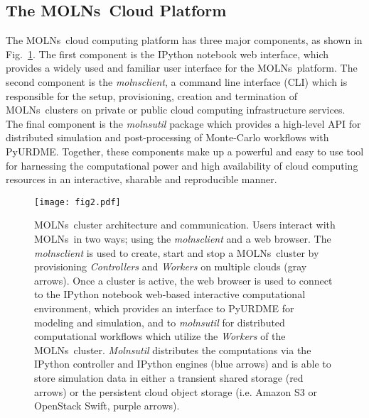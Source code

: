 \documentclass[final,leqno,onefignum,onetabnum]{siamltex1213}
\def\packagename {MOLNs}
\begin{document}
\subsection{The \packagename~Cloud Platform}

The  \packagename~cloud computing platform has three major components, as shown in Fig.~\ref{fig:fig2}. The first component is the IPython notebook web interface, which provides a widely used and familiar user interface for the \packagename~platform. The second component is the \emph{molnsclient}, a command line interface (CLI) which is responsible for the setup, provisioning, creation and termination of \packagename~clusters on private or public cloud computing infrastructure services.  The final component is the \emph{molnsutil} package which provides a high-level API for distributed simulation and post-processing of Monte-Carlo workflows with PyURDME.  Together, these components make up a powerful and easy to use tool for harnessing the computational power and high availability of cloud computing resources in an interactive, sharable and reproducible manner. 

\begin{figure}[htpb]
\begin{center}
\texttt{[image: fig2.pdf]}
\end{center}
\caption{\packagename~cluster architecture and communication.
Users interact with \packagename~in two ways; using the \emph{molnsclient} and a web browser.
The \emph{molnsclient} is used to create, start and stop a \packagename~cluster by provisioning \emph{Controllers} and \emph{Workers} on multiple clouds (gray arrows).  Once a cluster is active, the web browser is used to connect to the IPython notebook web-based interactive computational environment, which provides an interface to PyURDME for modeling and simulation, and to \emph{molnsutil} for distributed computational workflows which utilize the \emph{Workers} of the \packagename~cluster.  \emph{Molnsutil} distributes the computations via the IPython controller and IPython engines (blue arrows) and is able to store simulation data in either a transient shared storage (red arrows) or the persistent cloud object storage (i.e. Amazon S3 or OpenStack Swift, purple arrows).  
}
\label{fig:fig2}
\end{figure}
\end{document}

